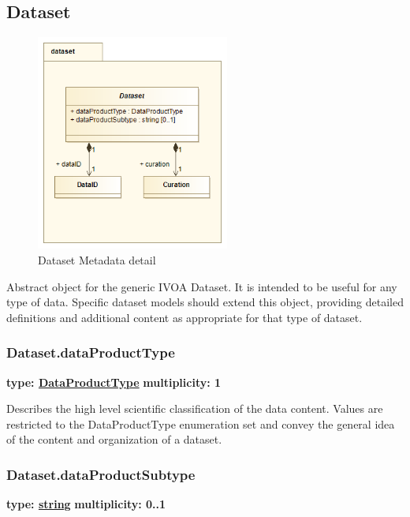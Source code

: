 \pagebreak
\subsection{Dataset}
\label{sect:dataset}

  \begin{figure}[h]
  \begin{center}
    \includegraphics[width=2.5in]{diagrams/Dataset.png}
    \caption{Dataset Metadata detail}\label{fig:ds_detail}
  \end{center}
  \end{figure}

  Abstract object for the generic IVOA Dataset. It is intended to be useful for
  any type of data. Specific dataset models should extend this object, providing
  detailed definitions and additional content as appropriate for that type of dataset.

  \subsubsection{Dataset.dataProductType}
  \textbf{type: \hyperref[sect:product]{DataProductType}} \newline
  \textbf{multiplicity: 1} \newline 
  
  Describes the high level scientific classification of the data content. Values
  are restricted to the DataProductType enumeration set and convey the general
  idea of the content and organization of a dataset.
  
  \subsubsection{Dataset.dataProductSubtype}
  \textbf{type: \hyperref[sect:ivoa]{string}} \newline
  \textbf{multiplicity: 0..1} \newline 

